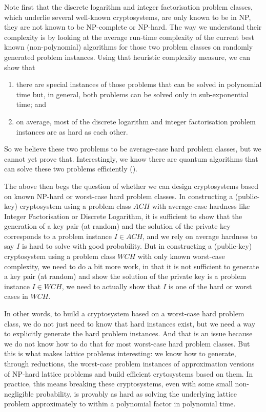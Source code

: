 \documentclass[../main.tex]{subfiles}
\begin{document}
Note first that the discrete logarithm and integer factorisation problem classes, which underlie several well-known cryptosystems, are only known to be in NP, they are not known to be NP-complete or NP-hard. The way we understand their complexity is by looking at the average run-time complexity of the current best known (non-polynomial) algorithms for those two problem classes on randomly generated problem instances. Using that heuristic complexity measure, we can show that 
\begin{enumerate}\itemsep1mm\parskip0mm
    \item  there are special instances of those problems that can be solved in polynomial time but, in general, both problems can be solved only in sub-exponential time; and
    \item on average, most of the discrete logarithm and integer factorisation problem instances are as hard as each other.
\end{enumerate} 
So we believe these two problems to be average-case hard problem classes, but we cannot yet prove that. 
Interestingly, we know there are quantum algorithms that can solve these two problems efficiently (\cite{bernstein09}).

The above then begs the question of whether we can design cryptosystems based on known NP-hard or worst-case hard problem classes. %
In constructing a (public-key) cryptosystem using a problem class $\mathit{ACH}$ with average-case hardness like Integer Factorisation or Discrete Logarithm, it is sufficient to show that the generation of a key pair (at random) and the solution of the private key corresponds to a problem instance $I \in \mathit{ACH}$, and we rely on average hardness to say $I$ is hard to solve with good probability. But in constructing a (public-key) cryptosystem using a problem class $\mathit{WCH}$ with only known worst-case complexity, we need to do a bit more work, in that it is not sufficient to generate a key pair (at random) and show the solution of the private key is a problem instance $I \in \mathit{WCH}$, we need to actually show that $I$ is one of the hard or worst cases in $\mathit{WCH}$.

In other words, to build a cryptosystem based on a worst-case hard problem class, we do not just need to know that hard instances exist, but we need a way to explicitly generate the hard problem instances. And that is an issue because we do not know how to do that for most worst-case hard problem classes. But this is what makes lattice problems interesting: we know how to generate, through reductions, the worst-case problem instances of approximation versions of NP-hard lattice problems and build efficient crytosystems based on them. In practice, this means breaking these cryptosystems, even with some small non-negligible probability, is provably as hard as solving the underlying lattice problem approximately to within a polynomial factor in polynomial time.
\end{document}
